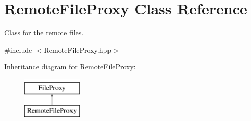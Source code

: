 \hypertarget{classRemoteFileProxy}{
\section{RemoteFileProxy Class Reference}
\label{classRemoteFileProxy}
}


Class for the remote files.  




{\ttfamily \#include $<$RemoteFileProxy.hpp$>$}

Inheritance diagram for RemoteFileProxy:\begin{figure}[H]
\begin{center}
\leavevmode
\includegraphics[height=2.000000cm]{classRemoteFileProxy}
\end{center}
\end{figure}
